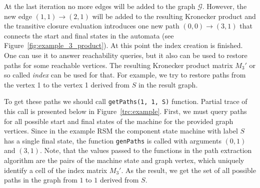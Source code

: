 At the last iteration no more edges will be added to the graph $\mathcal{G}$. However, the new edge $(1, 1) \rightarrow (2,1)$ will be added to the resulting Kronecker product and the transitive closure
evaluation introduces one new path $(0, 0) \rightarrow (3,1)$ that connects the start and final states in the automata (see Figure~\ref{fig:example_3_product}).
At this point the index creation is finished.
One can use it to answer reachability queries, but it also can be used
to restore paths for some reachable vertices. The resulting Kronecker product matrix
$M_3'$ or so called \textit{index} can be used for that. For example, we try to
restore paths from the vertex 1 to the vertex 1 derived from $S$ in the result graph.

To get these paths we should call \verb|getPaths(1, 1, S)| function.
Partial trace of this call is presented below in Figure~\ref{trc:example}.
First, we must query paths for all possible start and final states of the
machine for the provided graph vertices. Since in the example RSM the component
state machine with label $S$ has a single final state, the function
\verb|genPaths| is called with arguments $(0,1)$ and $(3,1)$.
Note, that the values passed to the functions in the path extraction algorithm are the
pairs of the machine state and graph vertex, which uniquely identify a cell of
the index matrix $M_3'$. As the result,
we get the set of all possible paths in the graph from $1$ to $1$ derived from $S$.

